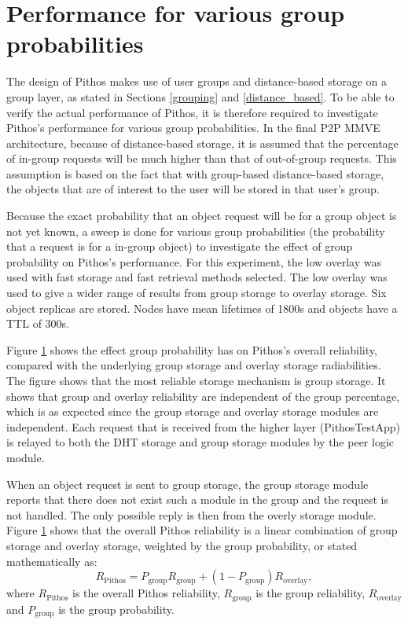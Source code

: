 \section{Performance for various group probabilities}

The design of Pithos makes use of user groups and distance-based storage on a group layer, as stated in Sections \ref{grouping} and \ref{distance_based}. To be able to verify the actual performance of Pithos, it is therefore required to investigate Pithos's performance for various group probabilities. In the final P2P MMVE architecture, because of distance-based storage, it is assumed that the percentage of in-group requests will be much higher than that of out-of-group requests. This assumption is based on the fact that with group-based distance-based storage, the objects that are of interest to the user will be stored in that user's group.

Because the exact probability that an object request will be for a group object is not yet known, a sweep is done for various group probabilities (the probability that a request is for a in-group object) to investigate the effect of group probability on Pithos's performance. For this experiment, the low overlay was used with fast storage and fast retrieval methods selected. The low overlay was used to give a wider range of results from group storage to overlay storage. Six object replicas are stored. Nodes have mean lifetimes of 1800s and objects have a TTL of 300s.


%
Figure \ref{} shows the effect group probability has on Pithos's overall reliability, compared with the underlying group storage and overlay storage radiabilities. The figure shows that the most reliable storage mechanism is group storage. It shows that group and overlay reliability are independent of the group percentage, which is as expected since the group storage and overlay storage modules are independent. Each request that is received from the higher layer (PithosTestApp) is relayed to both the DHT storage and group storage modules by the peer logic module.

When an object request is sent to group storage, the group storage module reports that there does not exist such a module in the group and the request is not handled. The only possible reply is then from the overly storage module. Figure \ref{} shows that the overall Pithos reliability is a linear combination of group storage and overlay storage, weighted by the group probability, or stated mathematically as:
%
\begin{equation}
R_{\textrm{Pithos}} = P_{\textrm{group}}R_{\textrm{group}} + (1-P_{\textrm{group}})R_{\textrm{overlay}},
\end{equation}
%
where $R_{\textrm{Pithos}}$ is the overall Pithos reliability, $R_{\textrm{group}}$ is the group reliability, $R_{\textrm{overlay}}$ and $P_{\textrm{group}}$ is the group probability.

